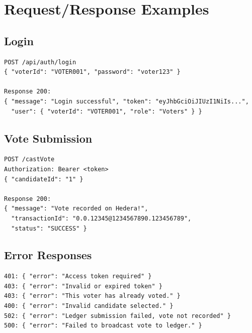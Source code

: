 \section{Request/Response Examples}
\label{sec:api-examples}

\subsection{Login}
\begin{lstlisting}[style=codeStyle, caption=Login request/response]
POST /api/auth/login
{ "voterId": "VOTER001", "password": "voter123" }

Response 200:
{ "message": "Login successful", "token": "eyJhbGciOiJIUzI1NiIs...",
  "user": { "voterId": "VOTER001", "role": "Voters" } }
\end{lstlisting}

\subsection{Vote Submission}
\begin{lstlisting}[style=codeStyle, caption=Vote submission request/response]
POST /castVote
Authorization: Bearer <token>
{ "candidateId": "1" }

Response 200:
{ "message": "Vote recorded on Hedera!",
  "transactionId": "0.0.12345@1234567890.123456789",
  "status": "SUCCESS" }
\end{lstlisting}

\subsection{Error Responses}
\begin{lstlisting}[style=codeStyle, caption=Common error responses]
401: { "error": "Access token required" }
403: { "error": "Invalid or expired token" }
403: { "error": "This voter has already voted." }
400: { "error": "Invalid candidate selected." }
502: { "error": "Ledger submission failed, vote not recorded" }
500: { "error": "Failed to broadcast vote to ledger." }
\end{lstlisting}
